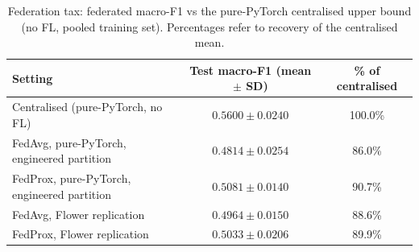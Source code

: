 \begin{table}[!htbp]
\centering
\small
\caption{Federation tax: federated macro-F1 vs the pure-PyTorch centralised upper bound (no FL, pooled training set). Percentages refer to recovery of the centralised mean.}
\label{tab:federation-tax}
\begin{tabular}{l c c}
\toprule
Setting & Test macro-F1 (mean $\pm$ SD) & \% of centralised \\
\midrule
  Centralised (pure-PyTorch, no FL)        & $0.5600 \pm 0.0240$ & 100.0\% \\
  FedAvg, pure-PyTorch, engineered partition & $0.4814 \pm 0.0254$ & 86.0\% \\
  FedProx, pure-PyTorch, engineered partition & $0.5081 \pm 0.0140$ & 90.7\% \\
  FedAvg, Flower replication               & $0.4964 \pm 0.0150$ & 88.6\% \\
  FedProx, Flower replication              & $0.5033 \pm 0.0206$ & 89.9\% \\
\bottomrule
\end{tabular}
\end{table}
